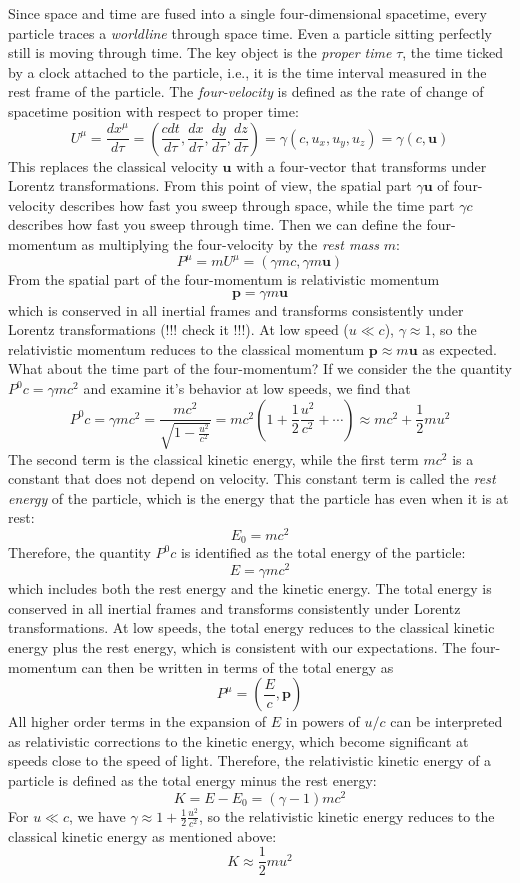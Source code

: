 \documentclass[12pt]{article}
\begin{document}
Since space and time are fused into a single four-dimensional spacetime, every particle traces a \textit{worldline} through space time. Even a particle sitting perfectly still is moving through time. The key object is the \textit{proper time} $\tau$, the time ticked by a clock attached to the particle, i.e., it is the time interval measured in the rest frame of the particle. The \textit{four-velocity} is defined as the rate of change of spacetime position with respect to proper time:
\[
U^\mu = \frac{dx^\mu}{d\tau} = \left(\frac{cdt}{d\tau}, \frac{dx}{d\tau}, \frac{dy}{d\tau}, \frac{dz}{d\tau} \right) = \gamma(c, u_x, u_y, u_z)=\gamma(c, \mathbf{u})
\]
This replaces the classical velocity $\mathbf{u}$ with a four-vector that transforms under Lorentz transformations. From this point of view, the spatial part $\gamma \mathbf{u}$ of four-velocity describes how fast you sweep through space, while the time part $\gamma c$ describes how fast you sweep through time. Then we can define the four-momentum as multiplying the four-velocity by the \textit{rest mass} $m$:
\[
P^\mu = m U^\mu =  (\gamma mc, \gamma m\mathbf{u}) 
\]
From the spatial part of the four-momentum is relativistic momentum
\[
\mathbf{p} = \gamma m \mathbf{u}
\]
which is conserved in all inertial frames and transforms consistently under Lorentz transformations (!!! check it !!!). At low speed ($u \ll c$), $\gamma \approx 1$, so the relativistic momentum reduces to the classical momentum $\mathbf{p} \approx m\mathbf{u}$ as expected. What about the time part of the four-momentum? If we consider the the quantity $P^0c= \gamma mc^2$ and examine it's behavior at low speeds, we find that
\[P^0c = \gamma mc^2 = \frac{mc^2}{\sqrt{1-\frac{u^2}{c^2}}} = mc^2\left(1 + \frac{1}{2}\frac{u^2}{c^2} + \cdots\right) \approx mc^2 + \frac{1}{2}mu^2
\]
The second term is the classical kinetic energy, while the first term $mc^2$ is a constant that does not depend on velocity. This constant term is called the \textit{rest energy} of the particle, which is the energy that the particle has even when it is at rest:
\[
E_0 =  mc^2
\]
Therefore, the quantity $P^0c$ is identified as the total energy of the particle:
\[E = \gamma mc^2
\]
which includes both the rest energy and the kinetic energy. The total energy is conserved in all inertial frames and transforms consistently under Lorentz transformations. At low speeds, the total energy reduces to the classical kinetic energy plus the rest energy, which is consistent with our expectations. The four-momentum can then be written in terms of the total energy as
\[P^\mu = \left(\frac{E}{c}, \mathbf{p}\right)
\]
All higher order terms in the expansion of $E$ in powers of $u/c$ can be interpreted as relativistic corrections to the kinetic energy, which become significant at speeds close to the speed of light. Therefore, the relativistic kinetic energy of a particle is defined as the total energy minus the rest energy:
\[
K = E - E_0 = (\gamma - 1)mc^2
\]
For $u \ll c$, we have $\gamma \approx 1 + \frac{1}{2}\frac{u^2}{c^2}$, so the relativistic kinetic energy reduces to the classical kinetic energy as mentioned above:
\[K \approx \frac{1}{2}mu^2
\]
\end{document}
